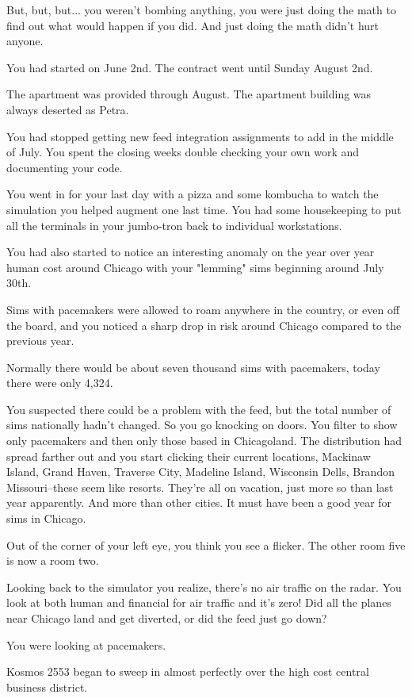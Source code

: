 \documentclass[a5paper, symmetric]{tufte-book}
\begin{document}
But, but, but... you weren't bombing anything, you were just doing the math to find out what would happen if you did. And just doing the math didn't hurt anyone.

You had started on June 2nd. The contract went until Sunday August 2nd. 

The apartment was provided through August. The apartment building was always deserted as Petra. 

You had stopped getting new feed integration assignments to add in the middle of July. You spent the closing weeks double checking your own work and documenting your code. 

You went in for your last day with a pizza and some kombucha to watch the simulation you helped augment one last time. You had some housekeeping to put all the terminals in your jumbo-tron back to individual workstations.

You had also started to notice an interesting anomaly on the year over year human cost around Chicago with your "lemming" sims beginning around July 30th. 

Sims with pacemakers were allowed to roam anywhere in the country, or even off the board, and you noticed a sharp drop in risk around Chicago compared to the previous year.

Normally there would be about seven thousand sims with pacemakers, today there were only 4,324.

You suspected there could be a problem with the feed, but the total number of sims nationally hadn't changed. So you go knocking on doors. You filter to show only pacemakers and then only those based in Chicagoland. The distribution had spread farther out and you start clicking their current locations, Mackinaw Island, Grand Haven, Traverse City, Madeline Island, Wisconsin Dells, Brandon Missouri--these seem like resorts. They're all on vacation, just more so than last year apparently. And more than other cities. It must have been a good year for sims in Chicago. 

Out of the corner of your left eye, you think you see a flicker. The other room five is now a room two. 

Looking back to the simulator you realize, there's no air traffic on the radar. You look at both human and financial for air traffic and it's zero! Did all the planes near Chicago land and get diverted, or did the feed just go down? 

You were looking at pacemakers.

Kosmos 2553 began to sweep in almost perfectly over the high cost central business district. 
\end{document}
